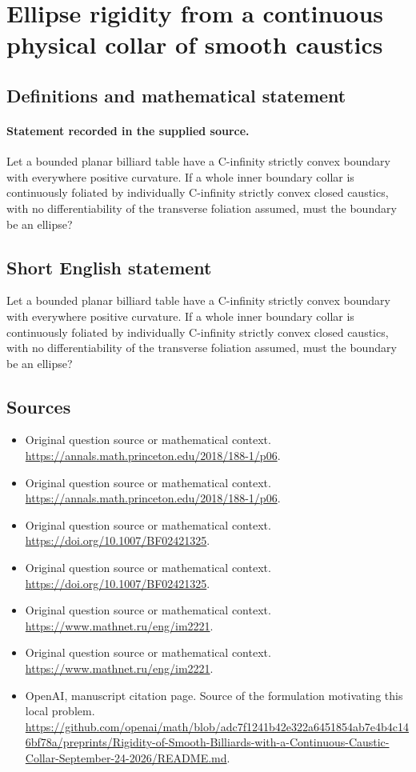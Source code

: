 \documentclass[11pt]{article}
\begin{document}
\section*{Ellipse rigidity from a continuous physical collar of smooth caustics}\label{statement}
\subsection{Definitions and mathematical statement}
\paragraph{Statement recorded in the supplied source.}
Let a bounded planar billiard table have a C-infinity strictly convex boundary with everywhere positive curvature. If a whole inner boundary collar is continuously foliated by individually C-infinity strictly convex closed caustics, with no differentiability of the transverse foliation assumed, must the boundary be an ellipse?
\subsection{Short English statement}
Let a bounded planar billiard table have a C-infinity strictly convex boundary with everywhere positive curvature. If a whole inner boundary collar is continuously foliated by individually C-infinity strictly convex closed caustics, with no differentiability of the transverse foliation assumed, must the boundary be an ellipse?
\subsection{Sources}
\begin{itemize}
\item[S1] Original question source or mathematical context.
\url{https://annals.math.princeton.edu/2018/188-1/p06}.
\item[S2] Original question source or mathematical context.
\url{https://annals.math.princeton.edu/2018/188-1/p06}.
\item[S3] Original question source or mathematical context.
\url{https://doi.org/10.1007/BF02421325}.
\item[S4] Original question source or mathematical context.
\url{https://doi.org/10.1007/BF02421325}.
\item[S5] Original question source or mathematical context.
\url{https://www.mathnet.ru/eng/im2221}.
\item[S6] Original question source or mathematical context.
\url{https://www.mathnet.ru/eng/im2221}.
\item[S7] OpenAI, manuscript citation page. Source of the formulation motivating this local problem.
\url{https://github.com/openai/math/blob/adc7f1241b42e322a6451854ab7e4b4c146bf78a/preprints/Rigidity-of-Smooth-Billiards-with-a-Continuous-Caustic-Collar-September-24-2026/README.md}.
\end{itemize}
\end{document}
